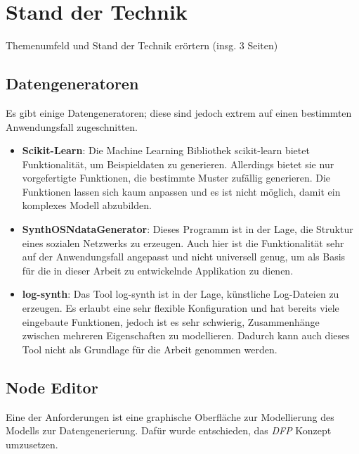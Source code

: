 
\chapter{Stand der Technik}

Themenumfeld und Stand der Technik erörtern (insg. 3 Seiten)

\section{Datengeneratoren}

Es gibt einige Datengeneratoren; diese sind jedoch extrem auf einen bestimmten Anwendungsfall zugeschnitten.

\begin{itemize}
    \item \textbf{Scikit-Learn}: Die Machine Learning Bibliothek scikit-learn bietet Funktionalität, um Beispieldaten zu generieren. Allerdings bietet sie nur vorgefertigte Funktionen, die bestimmte Muster zufällig generieren. Die Funktionen lassen sich kaum anpassen und es ist nicht möglich, damit ein komplexes Modell abzubilden. \cite{scikit-learn:paper, scikit-learn:generator}
    \item \textbf{SynthOSNdataGenerator}: Dieses Programm ist in der Lage, die Struktur eines sozialen Netzwerks zu erzeugen. Auch hier ist die Funktionalität sehr auf der Anwendungsfall angepasst und nicht universell genug, um als Basis für die in dieser Arbeit zu entwickelnde Applikation zu dienen. \cite{synthosndatagenerator}
    \item \textbf{log-synth}: Das Tool log-synth ist in der Lage, künstliche Log-Dateien zu erzeugen. Es erlaubt eine sehr flexible Konfiguration und hat bereits viele eingebaute Funktionen, jedoch ist es sehr schwierig, Zusammenhänge zwischen mehreren Eigenschaften zu modellieren. Dadurch kann auch dieses Tool nicht als Grundlage für die Arbeit genommen werden. \cite{logsynth}
\end{itemize}

\section{Node Editor}

Eine der Anforderungen ist eine graphische Oberfläche zur Modellierung des Modells zur Datengenerierung. Dafür wurde entschieden, das \textit{\ac{DFP}} Konzept umzusetzen.

